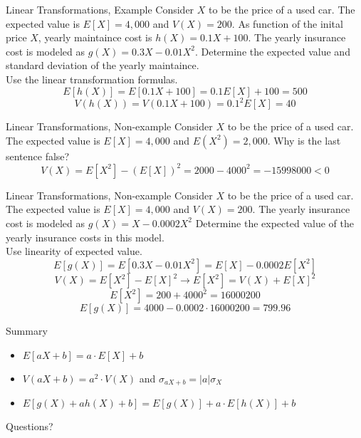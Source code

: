 \documentclass[]{beamer}
\newcommand{\qtns}[0]{\begin{center} Questions? \end{center}}
\newcommand{\nl}[1]{\vspace{#1 em}}
\begin{document}
\begin{frame}{Linear Transformations, Example}
    Consider $X$ to be the price of a used car. The expected value is $E[X] =4,000$ and $V(X) = 200$. As function of the inital price $X$, yearly maintaince cost is $h(X) = 0.1 X +100$. The yearly insurance cost is modeled as $g(X) = 0.3 X - 0.01 X^2$. Determine the expected value and standard deviation of the yearly maintaince.
    \\ \nl{0.5}
    \pause Use the linear transformation formulas.
    $$ E[h(X)] = E[0.1 X + 100] = 0.1 E[X] + 100 = 500  $$
    $$ V(h(X)) = V(0.1 X + 100) = 0.1^2 E[X]  = 40  $$
\end{frame}

\begin{frame}{Linear Transformations, Non-example}
    Consider $X$ to be the price of a used car. The expected value is $E[X] =4,000$ and $E(X^2) = 2,000$. Why is the last sentence false?
    \\ \nl{0.5}
    \pause 
    $$ V(X) = E[X^2] - (E[X])^2 = 2000 - 4000^2 = -15998000 < 0 $$
\end{frame}

\begin{frame}{Linear Transformations, Non-example}
    Consider $X$ to be the price of a used car. The expected value is $E[X] =4,000$ and $V(X) = 200$. The yearly insurance cost is modeled as $g(X) = X - 0.0002 X^2$ Determine the expected value of the yearly insurance costs in this model.
    \\ \nl{0.5}
    \pause Use linearity of expected value.
    $$E[g(X)] = E[0.3 X - 0.01 X^2] = E[X] - 0.0002 E[X^2] $$
    \pause
    $$V(X) = E[X^2] - E[X]^2 \rightarrow E[X^2] = V(X) + E[X]^2$$ 
    $$ E[X^2] = 200 + 4000^2 = 16000200$$
    \pause
    $$ E[g(X)] =  4000 - 0.0002\cdot 16000200 = 799.96  $$
\end{frame}

\begin{frame}{Summary}
    \begin{itemize}
        \item $E[aX+b] = a\cdot E[X] + b$
        \item $V(aX+b) = a^2\cdot V(X)$ and $\sigma_{aX+b} = |a| \sigma_{X}$
        \item $E[g(X) + a h(X) + b] = E[g(X)] + a\cdot E[h(X)] + b$
    \end{itemize}
    \qtns
\end{frame}
\end{document}
